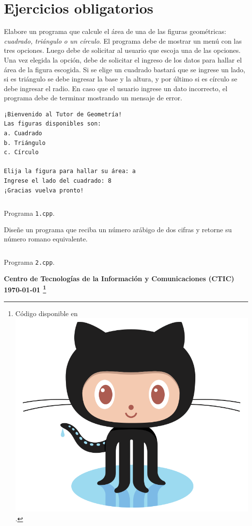 \documentclass[spanish,addpoints,answers,a4paper]{exam}
\newcommand{\unmarkedfntext}[1]{%
	\begingroup
	\renewcommand\thefootnote{}\footnote{#1}%
	\addtocounter{footnote}{-1}%
	\endgroup
}
\newcommand{\mychar}{%
	\begingroup\normalfont
	\includegraphics[height=\fontcharht\font`\B]{Octocat.png}%
	\endgroup
}
\begin{document}
\section*{Ejercicios obligatorios}

\begin{questions}

\question Elabore un programa que calcule el área de una de las figuras geométricas: {\itshape cuadrado, triángulo o un círculo}. El programa debe de mostrar un menú con las tres opciones. Luego debe de solicitar al usuario que escoja una de las opciones. Una vez elegida la opción, debe de solicitar el ingreso de los datos para hallar el área de la figura escogida. Si se elige un cuadrado bastará que se ingrese un lado, si es triángulo se debe ingresar la base y la altura, y por último si es círculo se debe ingresar el radio. En caso que el usuario ingrese un dato incorrecto, el programa debe de terminar mostrando un mensaje de error.

\begin{verbatim}
¡Bienvenido al Tutor de Geometría!
Las figuras disponibles son:
a. Cuadrado
b. Triángulo
c. Círculo

Elija la figura para hallar su área: a
Ingrese el lado del cuadrado: 8
¡Gracias vuelva pronto!
\end{verbatim}

\begin{solution}
	\begin{listing}[H]
		\footnotesize
		\inputminted{cpp}{1.cpp}
		\caption{Programa \texttt{1.cpp}.}
		\label{lst:1.9}
\end{listing}
\end{solution}

\question Diseñe un programa que reciba un número arábigo de dos cifras y retorne su número romano equivalente.

\begin{solution}
	\begin{listing}[H]
		\footnotesize
		\inputminted{cpp}{2.cpp}
		\caption{Programa \texttt{2.cpp}.}
		\label{lst:1.10}
\end{listing}
\end{solution}

\end{questions}

\begin{flushright}\bfseries
Centro de Tecnologías de la Información y Comunicaciones (CTIC)\\[2mm]
\today\unmarkedfntext{Código disponible en \href{https://github.com/carlosal1015/Cpp-Programming}{\mychar{}}.}
\end{flushright}
\end{document}
